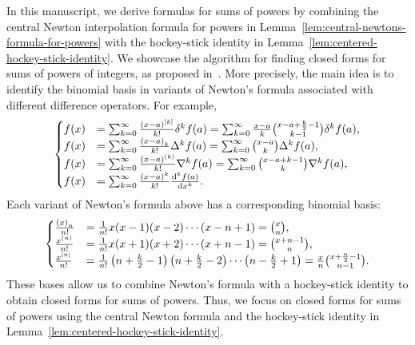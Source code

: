 In this manuscript, we derive formulas for sums of powers by combining the central Newton interpolation formula for powers in Lemma~\eqref{lem:central-newtons-formula-for-powers} with the hockey-stick identity in Lemma~\eqref{lem:centered-hockey-stick-identity}.
We showcase the algorithm for finding closed forms for sums of powers of integers, as proposed in~\cite[Alg.~(11.2)]{kolosov2026framework}.
More precisely, the main idea is to identify the binomial basis in variants of Newton's formula associated with different difference operators.
For example,
\begin{align*}
  \begin{cases}
    f(x)
    &= \sum_{k=0}^{\infty} \frac{(x-a)^{[k]}}{k!} \delta^{k} f(a)
    = \sum_{k=0}^{\infty} \frac{x-a}{k} \binom{x-a+\frac{k}{2}-1}{k-1} \delta^{k} f(a), \\
    f(x)
    &= \sum_{k=0}^{\infty} \frac{\left(x-a\right)_{k}}{k!} \Delta^k f(a)
    = \sum_{k=0}^{\infty} \binom{x-a}{k} \Delta^k f(a), \\
    f(x)
    &= \sum_{k=0}^{\infty} \frac{(x-a)^{\left(k\right)}}{k!} \nabla^k f(a)
    = \sum_{k=0}^{\infty} \binom{x-a+k-1}{k} \nabla^k f(a), \\
    f(x)
    &= \sum_{k=0}^{\infty} \frac{(x-a)^k}{k!} \frac{\mathrm{d}^{k} f(a)}{\mathrm{d} x^{k}}.
  \end{cases}
\end{align*}
Each variant of Newton's formula above has a corresponding binomial basis:
\begin{align*}
  \begin{cases}
    \frac{\left(x\right)_{n}}{n!}
    &= \frac{1}{n!} x(x-1)(x-2)\cdots(x-n+1) =\binom{x}{n}, \\
    \frac{x^{\left(n\right)}}{n!}
    &= \frac{1}{n!} x(x+1)(x+2)\cdots(x+n-1)  =\binom{x+n-1}{n}, \\
    \frac{x^{[n]}}{n!}
    &= \frac{1}{n!} \left( n + \frac{k}{2} -1 \right)
    \left( n + \frac{k}{2} -2 \right)
    \cdots \left( n - \frac{k}{2} +1 \right)
    =\frac{x}{n} \binom{x+\frac{n}{2}-1}{n-1}.
  \end{cases}
\end{align*}
These bases allow us to combine Newton's formula with a hockey-stick identity to obtain closed forms for sums of powers.
Thus, we focus on closed forms for sums of powers using the central Newton formula and the hockey-stick identity in Lemma~\eqref{lem:centered-hockey-stick-identity}.
